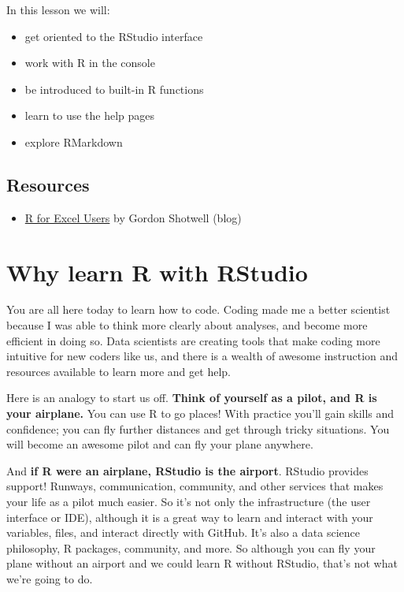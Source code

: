 \documentclass[]{book}
\providecommand{\tightlist}{%
  \setlength{\itemsep}{0pt}\setlength{\parskip}{0pt}}
\begin{document}
In this lesson we will:

\begin{itemize}
\tightlist
\item
  get oriented to the RStudio interface
\item
  work with R in the console
\item
  be introduced to built-in R functions
\item
  learn to use the help pages
\item
  explore RMarkdown
\end{itemize}

\hypertarget{resources-1}{%
\subsection{Resources}\label{resources-1}}

\begin{itemize}
\tightlist
\item
  \href{https://blog.shotwell.ca/posts/r_for_excel_users/}{R for Excel Users} by Gordon Shotwell (blog)
\end{itemize}

\hypertarget{why-learn-r-with-rstudio}{%
\section{Why learn R with RStudio}\label{why-learn-r-with-rstudio}}

You are all here today to learn how to code. Coding made me a better scientist because I was able to think more clearly about analyses, and become more efficient in doing so. Data scientists are creating tools that make coding more intuitive for new coders like us, and there is a wealth of awesome instruction and resources available to learn more and get help.

Here is an analogy to start us off. \textbf{Think of yourself as a pilot, and R is your airplane.} You can use R to go places! With practice you'll gain skills and confidence; you can fly further distances and get through tricky situations. You will become an awesome pilot and can fly your plane anywhere.

And \textbf{if R were an airplane, RStudio is the airport}. RStudio provides support! Runways, communication, community, and other services that makes your life as a pilot much easier. So it's not only the infrastructure (the user interface or IDE), although it is a great way to learn and interact with your variables, files, and interact directly with GitHub. It's also a data science philosophy, R packages, community, and more. So although you can fly your plane without an airport and we could learn R without RStudio, that's not what we're going to do.
\end{document}
